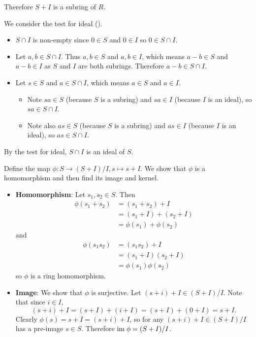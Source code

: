 \begin{questions}
\begin{partquestions}{\roman*}
        Therefore $S+I$ is a subring of $R$.

        \item We consider the test for ideal ().
        \begin{itemize}
            \item $S \cap I$ is non-empty since $0 \in S$ and $0 \in I$ so $0 \in S \cap I$.
            \item Let $a, b \in S \cap I$. Thus $a, b \in S$ and $a, b \in I$, which means $a - b \in S$ and $a - b \in I$ as $S$ and $I$ are both subrings. Therefore $a - b \in S \cap I$.
            \item Let $s \in S$ and $a \in S \cap I$, which means $a \in S$ and $a \in I$.
            \begin{itemize}
                \item Note $sa \in S$ (because $S$ is a subring) and $sa \in I$ (because $I$ is an ideal), so $sa \in S \cap I$.
                \item Note also $as \in S$ (because $S$ is a subring) and $as \in I$ (because $I$ is an ideal), so $as \in S \cap I$.
            \end{itemize}
        \end{itemize}
        By the test for ideal, $S \cap I$ is an ideal of $S$.

        \item Define the map $\phi: S \to (S+I)/I, s \mapsto s+I$. We show that $\phi$ is a homomorphism and then find its image and kernel.
        \begin{itemize}
            \item \textbf{Homomorphism}: Let $s_1, s_2 \in S$. Then
            \begin{align*}
                \phi(s_1 + s_2) &= (s_1 + s_2) + I\\
                &= (s_1 + I) + (s_2 + I)\\
                &= \phi(s_1) + \phi(s_2)
            \end{align*}
            and
            \begin{align*}
                \phi(s_1s_2) &= (s_1s_2) + I\\
                &= (s_1+I)(s_2+I)\\
                &= \phi(s_1)\phi(s_2)
            \end{align*}
            so $\phi$ is a ring homomorphism.

            \item \textbf{Image}: We show that $\phi$ is surjective. Let $(s+i) + I \in (S+I)/I$. Note that since $i \in I$,
            \[
                (s+i)+I = (s+I) + (i+I) = (s+I) + (0+I) = s+I.
            \]
            Clearly $\phi(s) = s+I = (s+i)+I$, so for any $(s+i) + I \in (S+I)/I$ has a pre-image $s \in S$. Therefore $\mathrm{im}\;\phi = (S+I)/I$.


\end{itemize}
\end{partquestions}
\end{questions}
